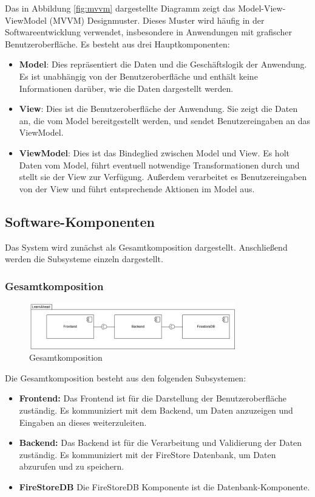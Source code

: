 Das in Abbildung \ref{fig:mvvm} dargestellte Diagramm zeigt das Model-View-ViewModel (MVVM) Designmuster. Dieses Muster wird häufig in der Softwareentwicklung verwendet, insbesondere in Anwendungen mit grafischer Benutzeroberfläche. Es besteht aus drei Hauptkomponenten:

\begin{itemize}
\item \textbf{Model}: Dies repräsentiert die Daten und die Geschäftslogik der Anwendung. Es ist unabhängig von der Benutzeroberfläche und enthält keine Informationen darüber, wie die Daten dargestellt werden.
\item \textbf{View}: Dies ist die Benutzeroberfläche der Anwendung. Sie zeigt die Daten an, die vom Model bereitgestellt werden, und sendet Benutzereingaben an das ViewModel.
\item \textbf{ViewModel}: Dies ist das Bindeglied zwischen Model und View. Es holt Daten vom Model, führt eventuell notwendige Transformationen durch und stellt sie der View zur Verfügung. Außerdem verarbeitet es Benutzereingaben von der View und führt entsprechende Aktionen im Model aus.
\end{itemize}
\subsection{Software-Komponenten}
Das System wird zunächst als Gesamtkomposition dargestellt. Anschließend werden die Subsysteme einzeln dargestellt. 
\subsubsection{Gesamtkomposition}
\begin{figure}[H]
    \centering
    \includegraphics[width=0.8\textwidth]{images/diagramme/Gesamtkomposition.png}
    \caption{Gesamtkomposition}
    \label{fig:Gesamtkomposition}
\end{figure}
\noindent
Die Gesamtkomposition besteht aus den folgenden Subsystemen:
\begin{itemize}
    \item \textbf{Frontend:} Das Frontend ist für die Darstellung der Benutzeroberfläche zuständig. Es kommuniziert mit dem Backend, um Daten anzuzeigen und Eingaben an dieses weiterzuleiten.
    \item \textbf{Backend:} Das Backend ist für die Verarbeitung und Validierung der Daten zuständig. Es kommuniziert mit der FireStore Datenbank, um Daten abzurufen und zu speichern.
    \item \textbf{FireStoreDB} Die FireStoreDB Komponente ist die Datenbank-Komponente.
\end{itemize}

